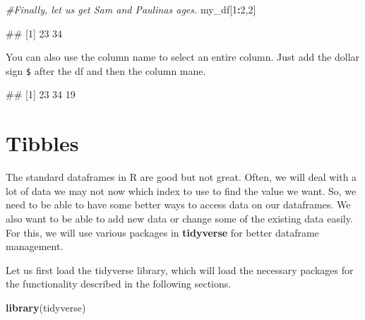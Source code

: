 \documentclass[
]{book}
\newenvironment{Shaded}{\begin{snugshade}}{\end{snugshade}}
\newcommand{\CommentTok}[1]{\textcolor[rgb]{0.56,0.35,0.01}{\textit{#1}}}
\newcommand{\DecValTok}[1]{\textcolor[rgb]{0.00,0.00,0.81}{#1}}
\newcommand{\FunctionTok}[1]{\textcolor[rgb]{0.13,0.29,0.53}{\textbf{#1}}}
\newcommand{\NormalTok}[1]{#1}
\newcommand{\SpecialCharTok}[1]{\textcolor[rgb]{0.81,0.36,0.00}{\textbf{#1}}}
\begin{document}
\begin{Shaded}
\begin{Highlighting}[]
\CommentTok{\#Finally, let us get Sam and Paulina\textquotesingle{}s ages.}
\NormalTok{my\_df[}\DecValTok{1}\SpecialCharTok{:}\DecValTok{2}\NormalTok{,}\DecValTok{2}\NormalTok{]}
\end{Highlighting}
\end{Shaded}

\begin{Shaded}
\begin{Highlighting}[]
\NormalTok{\#\# [1] 23 34}
\end{Highlighting}
\end{Shaded}

You can also use the column name to select an entire column. Just add the dollar sign \texttt{\$} after the df and then the column mane.

\begin{Shaded}
\end{Shaded}

\begin{Shaded}
\begin{Highlighting}[]
\NormalTok{\#\# [1] 23 34 19}
\end{Highlighting}
\end{Shaded}

\section{Tibbles}\label{tibbles}

The standard dataframes in R are good but not great. Often, we will deal with a lot of data we may not now which index to use to find the value we want. So, we need to be able to have some better ways to access data on our dataframes. We also want to be able to add new data or change some of the existing data easily. For this, we will use various packages in \textbf{tidyverse} for better dataframe management.

Let us first load the tidyverse library, which will load the necessary packages for the functionality described in the following sections.

\begin{Shaded}
\begin{Highlighting}[]
\FunctionTok{library}\NormalTok{(tidyverse)}
\end{Highlighting}
\end{Shaded}
\end{document}
